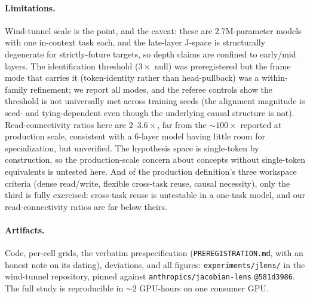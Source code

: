 \documentclass[11pt]{article}
\newcommand{\Jspace}{J\mbox{-}space}
\begin{document}
\paragraph{Limitations.} Wind-tunnel scale is the point, and the caveat:
these are 2.7M-parameter models with one in-context task each, and the
late-layer \Jspace{} is structurally degenerate for strictly-future
targets, so depth claims are confined to early/mid layers. The
identification threshold ($3\times$ null) was preregistered but the frame
mode that carries it (token-identity rather than head-pullback) was a
within-family refinement; we report all modes, and the referee controls
show the threshold is not universally met across training seeds (the
alignment magnitude is seed- and tying-dependent even though the
underlying causal structure is not). Read-connectivity ratios
here are $2$--$3.6\times$, far from the ${\sim}100\times$ reported at
production scale, consistent with a 6-layer model having little room for
specialization, but unverified. The hypothesis space is single-token by
construction, so the production-scale concern about concepts without
single-token equivalents is untested here. And of the production
definition's three workspace criteria (dense read/write, flexible
cross-task reuse, causal necessity), only the third is fully exercised:
cross-task reuse is untestable in a one-task model, and our
read-connectivity ratios are far below theirs.

\paragraph{Artifacts.} Code, per-cell grids, the verbatim
prespecification (\texttt{PREREGISTRATION.md}, with an honest note on
its dating), deviations, and all figures: \texttt{experiments/jlens/}
in the wind-tunnel repository, pinned against
\texttt{anthropics/jacobian-lens} \texttt{@581d3986}. The full study is reproducible in ${\sim}2$ GPU-hours
on one consumer GPU.



\end{document}
